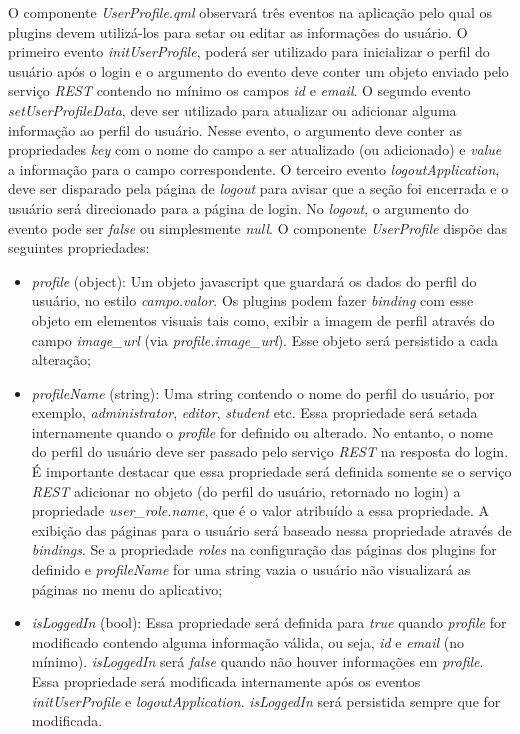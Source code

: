 O componente \textit{UserProfile.qml} observará três eventos na aplicação pelo qual os plugins devem utilizá-los para setar ou editar as informações do usuário. O primeiro evento \textit{initUserProfile}, poderá ser utilizado para inicializar o perfil do usuário após o login e o argumento do evento deve conter um objeto enviado pelo serviço \textit{REST} contendo no mínimo os campos \textit{id} e \textit{email}. O segundo evento \textit{setUserProfileData}, deve ser utilizado para atualizar ou adicionar alguma informação ao perfil do usuário. Nesse evento, o argumento deve conter as propriedades \textit{key} com o nome do campo a ser atualizado (ou adicionado) e \textit{value} a informação para o campo correspondente. O terceiro evento \textit{logoutApplication}, deve ser disparado pela página de \textit{logout} para avisar que a seção foi encerrada e o usuário será direcionado para a página de login. No \textit{logout}, o argumento do evento pode ser \textit{false} ou simplesmente \textit{null}. O componente \textit{UserProfile} dispõe das seguintes propriedades:

\begin{itemize}
	\item \textit{profile} (object): Um objeto javascript que guardará os dados do perfil do usuário, no estilo \textit{campo.valor}. Os plugins podem fazer \textit{binding} com esse objeto em elementos visuais tais como, exibir a imagem de perfil através do campo \textit{image\_url} (via \textit{profile.image\_url}). Esse objeto será persistido a cada alteração;

	\item \textit{profileName} (string): Uma string contendo o nome do perfil do usuário, por exemplo, \textit{administrator}, \textit{editor}, \textit{student} etc. Essa propriedade será setada internamente quando o \textit{profile} for definido ou alterado. No entanto, o nome do perfil do usuário deve ser passado pelo serviço \textit{REST} na resposta do login. É importante destacar que essa propriedade será definida somente se o serviço \textit{REST} adicionar no objeto (do perfil do usuário, retornado no login) a propriedade \textit{user\_role.name}, que é o valor atribuído a essa propriedade. A exibição das páginas para o usuário será baseado nessa propriedade através de \textit{bindings}. Se a propriedade \textit{roles} na configuração das páginas dos plugins for definido e \textit{profileName} for uma string vazia o usuário não visualizará as páginas no menu do aplicativo;

	\item \textit{isLoggedIn} (bool): Essa propriedade será definida para \textit{true} quando \textit{profile} for modificado contendo alguma informação válida, ou seja, \textit{id} e \textit{email} (no mínimo). \textit{isLoggedIn} será \textit{false} quando não houver informações em \textit{profile}. Essa propriedade será modificada internamente após os eventos \textit{initUserProfile} e \textit{logoutApplication}. \textit{isLoggedIn} será persistida sempre que for modificada.
\end{itemize}

